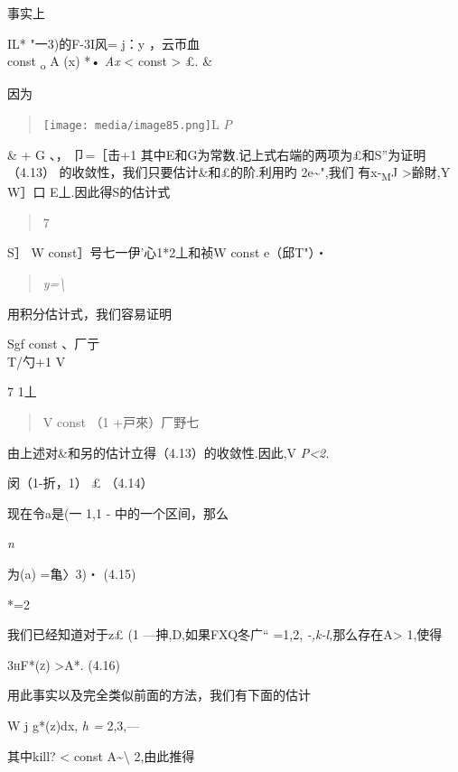 事实上

IL* "一3)的F-3I风= j：\textbar{}y \textbar{}，云帀血\\
const \textbar{}\textsubscript{o} \textbar{} A (x) \textbar{} *•
\emph{Ax} \textless{} const \textgreater{} £. \&

因为

\begin{quote}
\texttt{[image: media/image85.png]}L
\emph{P}
\end{quote}

\& + G 、， 卩=［击+1
其中E和G为常数.记上式右端的两项为£和S''为证明（4.13）
的收敛性，我们只要估计\&和£的阶.利用\textbar{}旳\textbar{}
2e\textasciitilde{}",我们 有\textbar{}x-\textsubscript{M}J
\textgreater{}齢財,Y W］口 E丄.因此得S的估计式

\begin{quote}
7
\end{quote}

S］ W const］号七一伊'\textbar{}心1*2丄和祯W const e（邱T"）・

\begin{quote}
\emph{y=\textbackslash{}}
\end{quote}

用积分估计式，我们容易证明

Sgf const 、厂亍\\
T/勺+1 V

7 1丄

\begin{quote}
V const （1 +戸來）厂野七
\end{quote}

由上述对\&和另的估计立得（4.13）的收敛性.因此,V \emph{P\textless{}2.}

闵（1-折，1） £ （4.14）

现在令a是(一 1,1 - 中的一个区间，那么

\emph{n}

为(a) =亀〉3)・ (4.15)

*=2

我们已经知道对于z£ (1 ---抻,D,如果FXQ冬广`` =1,2,
\emph{-,k-l,}那么存在A\textgreater{} 1,使得

\textsc{\textbar{}3hF*(z)\textbar{}} \textgreater{}A*. (4.16)

用此事实以及完全类似前面的方法，我们有下面的估计

W j g*(z)dx, \emph{h =} 2,3,---

其中kill? \textless{} const A\textasciitilde{}\textbackslash{}
2,由此推得

